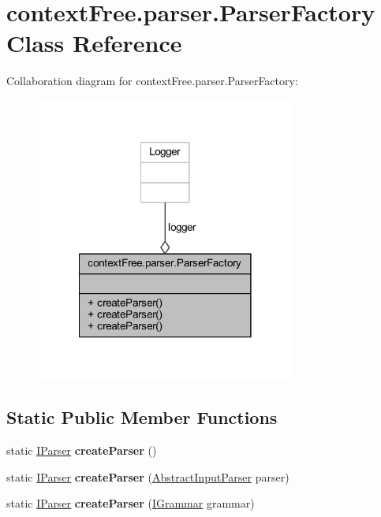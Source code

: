 \hypertarget{classcontext_free_1_1parser_1_1_parser_factory}{\section{context\-Free.\-parser.\-Parser\-Factory Class Reference}
\label{classcontext_free_1_1parser_1_1_parser_factory}
}


Collaboration diagram for context\-Free.\-parser.\-Parser\-Factory\-:
\nopagebreak
\begin{figure}[H]
\begin{center}
\leavevmode
\includegraphics[width=242pt]{classcontext_free_1_1parser_1_1_parser_factory__coll__graph}
\end{center}
\end{figure}
\subsection*{Static Public Member Functions}
\begin{DoxyCompactItemize}
\item 
\hypertarget{classcontext_free_1_1parser_1_1_parser_factory_ace675bb41d96bc1933cafbb04e34a928}{static \hyperlink{interfacecontext_free_1_1parser_1_1_i_parser}{I\-Parser} {\bfseries create\-Parser} ()}\label{classcontext_free_1_1parser_1_1_parser_factory_ace675bb41d96bc1933cafbb04e34a928}

\item 
\hypertarget{classcontext_free_1_1parser_1_1_parser_factory_a18495bcc1663076b276180a3c695e5de}{static \hyperlink{interfacecontext_free_1_1parser_1_1_i_parser}{I\-Parser} {\bfseries create\-Parser} (\hyperlink{classinput_parser_1_1_abstract_input_parser}{Abstract\-Input\-Parser} parser)}\label{classcontext_free_1_1parser_1_1_parser_factory_a18495bcc1663076b276180a3c695e5de}

\item 
\hypertarget{classcontext_free_1_1parser_1_1_parser_factory_aa1cf87208ec422991a7bd454358b8161}{static \hyperlink{interfacecontext_free_1_1parser_1_1_i_parser}{I\-Parser} {\bfseries create\-Parser} (\hyperlink{interfacecontext_free_1_1grammar_1_1_i_grammar}{I\-Grammar} grammar)}\label{classcontext_free_1_1parser_1_1_parser_factory_aa1cf87208ec422991a7bd454358b8161}

\end{DoxyCompactItemize}
